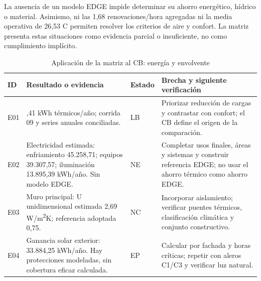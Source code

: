 La ausencia de un modelo EDGE impide determinar su ahorro energético, hídrico o material. Asimismo, ni las 1,68 renovaciones/hora agregadas ni la media operativa de 26,53 \textdegree C permiten resolver los criterios de aire y confort. La matriz presenta estas situaciones como evidencia parcial o insuficiente, no como cumplimiento implícito.
\par\medskip
\begin{table}[H]\centering\caption{Aplicación de la matriz al CB: energía y envolvente}
{\fontsize{10}{12.5}\selectfont\singlespacing\renewcommand{\arraystretch}{1.3}\setlength{\tabcolsep}{4pt}\begin{tabular}{>{\raggedright\arraybackslash}p{0.8cm}>{\raggedright\arraybackslash}p{5.5cm}>{\raggedright\arraybackslash}p{1.4cm}>{\raggedright\arraybackslash}p{6.2cm}}\toprule ID & Resultado o evidencia & Estado & Brecha y siguiente verificación \\ \midrule
E01 & 84.759,41 kWh térmicos/año; corrida 09 y series anuales conciliadas. & LB & Priorizar reducción de cargas y contrastar con confort; el CB define el origen de la comparación. \\[5pt]
E02 & Electricidad estimada: enfriamiento 45.258,71; equipos 39.307,57; iluminación 13.895,39 kWh/año. Sin modelo EDGE. & NE & Completar usos finales, áreas y sistemas y construir referencia EDGE; no usar el ahorro térmico como ahorro EDGE. \\[5pt]
E03 & Muro principal: U unidimensional estimada 2,69 W/m\textsuperscript{2}K; referencia adoptada 0,75. & NC & Incorporar aislamiento; verificar puentes térmicos, clasificación climática y conjunto constructivo. \\[5pt]
E04 & Ganancia solar exterior: 33.884,25 kWh/año. Hay protecciones modeladas, sin cobertura eficaz calculada. & EP & Calcular por fachada y horas críticas; repetir con aleros C1/C3 y verificar luz natural. \\[5pt]
\bottomrule\end{tabular}}\end{table}\par\medskip
